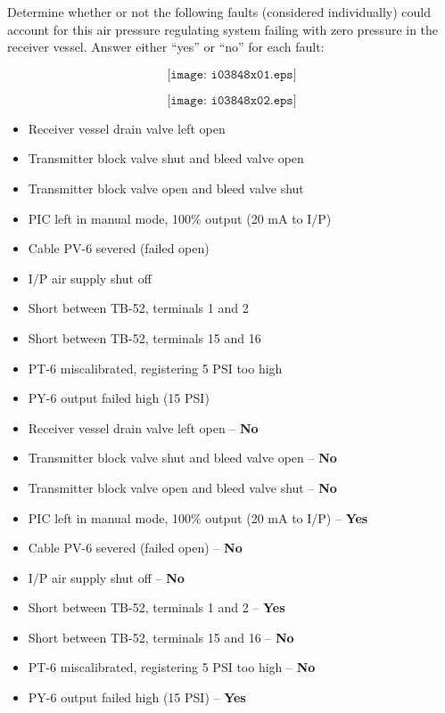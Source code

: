

Determine whether or not the following faults (considered individually) could account for this air pressure regulating system failing with zero pressure in the receiver vessel.  Answer either ``yes'' or ``no'' for each fault:

$$\texttt{[image: i03848x01.eps]}$$

$$\texttt{[image: i03848x02.eps]}$$

\begin{itemize}
\item{} Receiver vessel drain valve left open
\item{} Transmitter block valve shut and bleed valve open
\item{} Transmitter block valve open and bleed valve shut
\item{} PIC left in manual mode, 100\% output (20 mA to I/P)
\item{} Cable PV-6 severed (failed open)
\item{} I/P air supply shut off
\item{} Short between TB-52, terminals 1 and 2
\item{} Short between TB-52, terminals 15 and 16 
\item{} PT-6 miscalibrated, registering 5 PSI too high
\item{} PY-6 output failed high (15 PSI) 

\end{itemize}







\begin{itemize}
\item{} Receiver vessel drain valve left open -- {\bf No}
\item{} Transmitter block valve shut and bleed valve open -- {\bf No}
\item{} Transmitter block valve open and bleed valve shut -- {\bf No}
\item{} PIC left in manual mode, 100\% output (20 mA to I/P) -- {\bf Yes}
\item{} Cable PV-6 severed (failed open) -- {\bf No}
\item{} I/P air supply shut off -- {\bf No}
\item{} Short between TB-52, terminals 1 and 2 -- {\bf Yes}
\item{} Short between TB-52, terminals 15 and 16 -- {\bf No}
\item{} PT-6 miscalibrated, registering 5 PSI too high -- {\bf No}
\item{} PY-6 output failed high (15 PSI) -- {\bf Yes}
\end{itemize}



